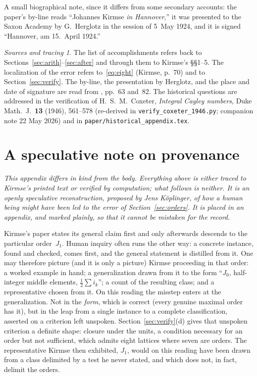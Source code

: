 \documentclass[11pt]{amsart}
\numberwithin{equation}{section}
\theoremstyle{definition}
\theoremstyle{plain}
\theoremstyle{remark}
\newtheorem*{tracing}{Sources and tracing}
\begin{document}
A small biographical note, since it differs from some secondary accounts:
the paper's by-line reads ``Johannes Kirmse \emph{in Hannover},'' it was
presented to the Saxon Academy by G.~Herglotz in the session of 5~May 1924,
and it is signed ``Hannover, am 15.~April 1924.''

\begin{tracing}
The list of accomplishments refers back to
Sections~\ref{sec:arith}--\ref{sec:after} and through them to Kirmse's
\S\S1--5.  The localization of the error refers to~\eqref{eq:eight}
(Kirmse, p.~70) and to Section~\ref{sec:verify}.  The by-line, the
presentation by Herglotz, and the place and date of signature are read from
\cite{Kirmse1924}, pp.~63 and~82.  The historical questions are
addressed in the verification of H.~S.~M.~Coxeter,
\emph{Integral Cayley numbers}, Duke Math.\ J.~\textbf{13} (1946),
561--578 (re-derived in \texttt{verify\_coxeter\_1946.py}; companion note
22 May 2026) and in \texttt{paper/historical\_appendix.tex}.
\end{tracing}

\appendix
\section{A speculative note on provenance}\label{app:provenance}

\emph{This appendix differs in kind from the body.  Everything above is
either traced to Kirmse's printed text or verified by computation; what
follows is neither.  It is an openly speculative reconstruction, proposed
by Jens K\"oplinger, of how a human being might have been led to the error
of Section~\ref{sec:orders}.  It is placed in an appendix, and marked
plainly, so that it cannot be mistaken for the record.}

\medskip

Kirmse's paper states its general claim first and only afterwards descends to
the particular order~$J_1$.  Human inquiry often runs the other way: a
concrete instance, found and checked, comes first, and the general statement
is distilled from it.  One may therefore picture (and it is only a
picture) Kirmse proceeding in that order: a worked example in hand; a
generalization drawn from it to the form ``$J_0$, half-integer middle
elements, $\tfrac12\sum i_k$''; a count of the resulting class; and a
representative chosen from it.  On this reading the misstep enters at the
generalization.  Not in the \emph{form}, which is correct (every genuine
maximal order has it), but in the leap from a single instance to a complete
classification, asserted on a criterion left unspoken.
Section~\ref{sec:verify}(d) gives that unspoken criterion a definite shape:
closure under the units, a condition necessary for an order but not
sufficient, which admits eight lattices where seven are orders.  The
representative Kirmse then exhibited, $J_1$, would on this reading have been
drawn from a class delimited by a test he never stated, and which does
not, in fact, delimit the orders.
\end{document}
